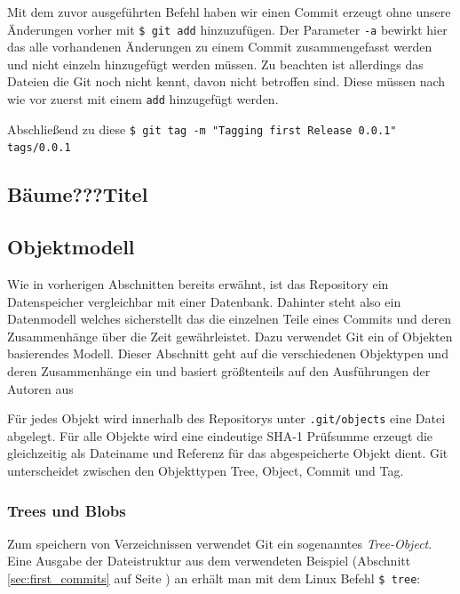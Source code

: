 

Mit dem zuvor ausgeführten Befehl haben wir einen Commit erzeugt ohne unsere
Änderungen vorher mit \texttt{\$ git add} hinzuzufügen. Der Parameter
\texttt{-a} bewirkt hier das alle vorhandenen Änderungen zu einem Commit
zusammengefasst werden und nicht einzeln hinzugefügt werden müssen. Zu beachten
ist allerdings das Dateien die Git noch nicht kennt, davon nicht betroffen
sind. Diese müssen nach wie vor zuerst mit einem \texttt{add} hinzugefügt
werden.

Abschließend zu diese \texttt{\$ git tag -m "Tagging first Release 0.0.1"
tags/0.0.1}

\subsection{Bäume???Titel}\label{sec:trees}
\subsection{Objektmodell}\label{objectmodel}
Wie in vorherigen Abschnitten bereits erwähnt, ist das Repository ein
Datenspeicher vergleichbar mit einer Datenbank. Dahinter steht also ein
Datenmodell welches sicherstellt das die einzelnen Teile eines Commits und
deren Zusammenhänge über die Zeit gewährleistet. Dazu verwendet Git ein of
Objekten basierendes Modell. Dieser Abschnitt geht auf die verschiedenen
Objektypen und deren Zusammenhänge ein und basiert größtenteils auf den
Ausführungen der Autoren aus \cite[S.~49-59]{gitosp}

Für jedes Objekt wird innerhalb des Repositorys unter \texttt{.git/objects}
eine Datei abgelegt. Für alle Objekte wird eine eindeutige \gls{SHA-1}
Prüfsumme erzeugt die gleichzeitig als Dateiname und Referenz für das
abgespeicherte Objekt dient. Git unterscheidet zwischen den Objekttypen Tree,
Object, Commit und Tag.

\subsubsection{Trees und Blobs}\label{sec:treeblobobjects}
Zum speichern von Verzeichnissen verwendet Git ein sogenanntes
\textit{Tree-Object}. Eine Ausgabe der Dateistruktur aus dem verwendeten
Beispiel (Abschnitt \ref{sec:first_commits} auf Seite
\pageref{sec:first_commits}) an erhält man mit dem Linux Befehl \texttt{\$
tree}:

